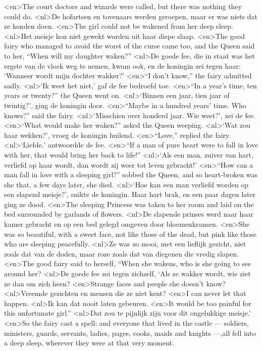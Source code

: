 <en>The court doctors and wizards were called, but there was nothing they could do.
<nl>De hofartsen en tovenaars werden geroepen, maar er was niets dat ze konden doen.
<en>The girl could not be wakened from her deep sleep.
<nl>Het meisje kon niet gewekt worden uit haar diepe slaap.
<en>The good fairy who managed to avoid the worst of the curse came too, and the Queen said to her, “When will my daughter waken?” 
<nl>De goede fee, die in staat was het ergste van de vloek weg te nemen, kwam ook, en de koningin zei tegen haar: `Wanneer wordt mijn dochter wakker?' 
<en>“I don’t know,” the fairy admitted sadly.
<nl>`Ik weet het niet,' gaf de fee bedroefd toe.
<en>“In a year’s time, ten years or twenty?” the Queen went on.
<nl>`Binnen een jaar, tien jaar of twintig?', ging de koningin door.
<en>“Maybe in a hundred years’ time. Who knows?” said the fairy.
<nl>`Misschien over honderd jaar. Wie weet?', zei de fee.
<en>`What would make her waken?” asked the Queen weeping.
<nl>`Wat zou haar wekken?', vroeg de koningin huilend.
<en>“Love,” replied the fairy.
<nl>`Liefde,' antwoordde de fee.
<en>“If a man of pure heart were to fall in love with her, that would bring her back to life!”
<nl>`Als een man, zuiver van hart, verliefd op haar wordt, dan wordt zij weer tot leven gebracht!'
<en>“How can a man fall in love with a sleeping girl?” sobbed the Queen, and so heart-broken was she that, a few days later, she died.
<nl>`Hoe kan een man verliefd worden op een slapend meisje?', snikte de koningin. Haar hart brak, en een paar dagen later ging ze dood.
<en>The sleeping Princess was taken to her room and laid on the bed surrounded by garlands of flowers.
<nl>De slapende prinses werd naar haar kamer gebracht en op een bed gelegd omgeven door bloemenkransen.
<en>She was so beautiful, with a sweet face, not like those of the dead, but pink like those who are sleeping peacefully.
<nl>Ze was zo mooi, met een lieflijk gezicht, niet zoals dat van de doden, maar roze zoals dat van diegenen die vredig slapen.
<en>The good fairy said to herself, “When she wakens, who is she going to see around her?
<nl>De goede fee zei tegen zichzelf, `Als ze wakker wordt, wie ziet ze dan om zich heen?
<en>Strange faces and people she doesn’t know?
<nl>Vreemde gezichten en mensen die ze niet kent?
<en>I can never let that happen.
<nl>Ik kan dat nooit laten gebeuren.
<en>It would be too painful for this unfortunate girl.”
<nl>Dat zou te pijnlijk zijn voor dit ongelukkige meisje.'
<en>So the fairy cast a spell; and everyone that lived in the castle --- soldiers, ministers, guards, servants, ladies, pages, cooks, maids and knights –--,all fell into a deep sleep, wherever they were at that very moment.
